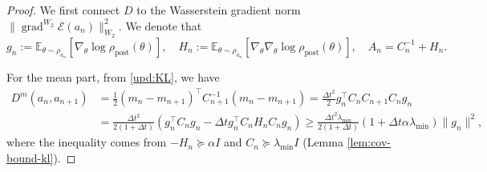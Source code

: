 \documentclass[11pt]{article}
\theoremstyle{plain}
\theoremstyle{definition}
\theoremstyle{remark}
\newcommand{\grad}{\operatorname{grad}}
\begin{document}
\begin{proof}
    We first connect $D$ to the Wasserstein gradient norm $\|\grad^{W_2} \mathcal{E} (a_n)\|^2_{W_2}$.
    We denote that $$g_n := \mathbb{E}_{\theta \sim \rho_{a_n}} [\nabla_\theta \log \rho_\mathrm{post} (\theta)], \quad H_n := \mathbb{E}_{\theta \sim \rho_{a_n}} [\nabla_\theta \nabla_\theta \log \rho_\mathrm{post} (\theta)], \quad A_n = C_n^{-1} + H_n.$$ 
    
    For the mean part, from \eqref{upd:KL}, we have
    \begin{align*}
        D^m (a_n, a_{n+1}) &= \frac{1}{2} (m_n - m_{n+1})^\top C_{n+1}^{-1} (m_n - m_{n+1}) = \frac{\Delta t^2}{2} g_n^\top C_n C_{n+1} C_n g_n \\
        &= \frac{\Delta t^2}{2 (1 + \Delta t)} (g_n^\top C_n g_n - \Delta t g_n^\top C_n H_n C_n g_n) \geq \frac{\Delta t^2 \lambda_{\min}}{2 (1 + \Delta t)} (1 + \Delta t \alpha \lambda_{\min}) \|g_n\|^2,
    \end{align*}
    where the inequality comes from $-H_n \succeq \alpha I$ and $C_n \succeq \lambda_{\min} I$ (Lemma \ref{lem:cov-bound-kl}).


\end{proof}
\end{document}
